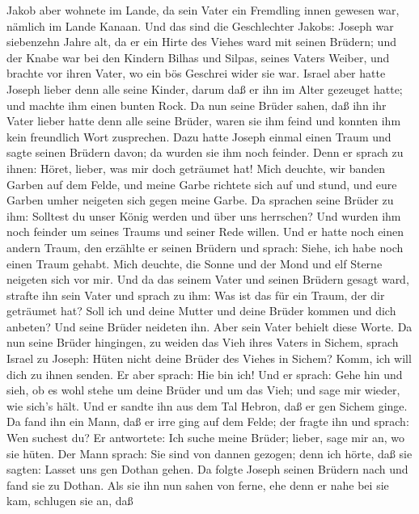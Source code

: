  Jakob aber wohnete im Lande, da sein Vater ein Fremdling
innen gewesen war, nämlich im Lande Kanaan.  Und das sind
die Geschlechter Jakobs: Joseph war siebenzehn Jahre alt, da er ein
Hirte des Viehes ward mit seinen Brüdern; und der Knabe war bei den
Kindern Bilhas und Silpas, seines Vaters Weiber, und brachte vor ihren
Vater, wo ein bös Geschrei wider sie war.  Israel aber hatte
Joseph lieber denn alle seine Kinder, darum daß er ihn im Alter gezeuget
hatte; und machte ihm einen bunten Rock.  Da nun seine
Brüder sahen, daß ihn ihr Vater lieber hatte denn alle seine Brüder,
waren sie ihm feind und konnten ihm kein freundlich Wort zusprechen.
 Dazu hatte Joseph einmal einen Traum und sagte seinen
Brüdern davon; da wurden sie ihm noch feinder.  Denn er
sprach zu ihnen: Höret, lieber, was mir doch geträumet hat! 
Mich deuchte, wir banden Garben auf dem Felde, und meine Garbe richtete
sich auf und stund, und eure Garben umher neigeten sich gegen meine
Garbe.  Da sprachen seine Brüder zu ihm: Solltest du unser
König werden und über uns herrschen? Und wurden ihm noch feinder um
seines Traums und seiner Rede willen.  Und er hatte noch
einen andern Traum, den erzählte er seinen Brüdern und sprach: Siehe,
ich habe noch einen Traum gehabt. Mich deuchte, die Sonne und der Mond
und elf Sterne neigeten sich vor mir.  Und da das seinem
Vater und seinen Brüdern gesagt ward, strafte ihn sein Vater und sprach
zu ihm: Was ist das für ein Traum, der dir geträumet hat? Soll ich und
deine Mutter und deine Brüder kommen und dich anbeten?  Und
seine Brüder neideten ihn. Aber sein Vater behielt diese Worte.
 Da nun seine Brüder hingingen, zu weiden das Vieh ihres
Vaters in Sichem,  sprach Israel zu Joseph: Hüten nicht
deine Brüder des Viehes in Sichem? Komm, ich will dich zu ihnen senden.
Er aber sprach: Hie bin ich!  Und er sprach: Gehe hin und
sieh, ob es wohl stehe um deine Brüder und um das Vieh; und sage mir
wieder, wie sich's hält. Und er sandte ihn aus dem Tal Hebron, daß er
gen Sichem ginge.  Da fand ihn ein Mann, daß er irre ging
auf dem Felde; der fragte ihn und sprach: Wen suchest du? 
Er antwortete: Ich suche meine Brüder; lieber, sage mir an, wo sie
hüten.  Der Mann sprach: Sie sind von dannen gezogen; denn
ich hörte, daß sie sagten: Lasset uns gen Dothan gehen. Da folgte Joseph
seinen Brüdern nach und fand sie zu Dothan.  Als sie ihn
nun sahen von ferne, ehe denn er nahe bei sie kam, schlugen sie an, daß
